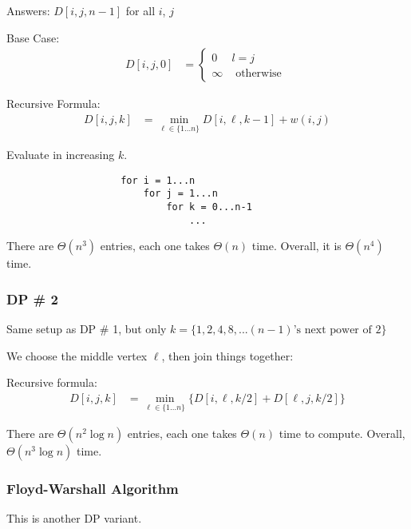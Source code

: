                 Answers: $D[i, j, n-1]$ for all $i$, $j$

                Base Case:
                \begin{align*}
                    D[i, j, 0] &=
                    \left\{
                        \begin{array}{lr}
                            0 & l = j \\
                            \infty & \text{ otherwise }
                        \end{array}
                    \right.
                \end{align*}

                Recursive Formula:
                \begin{align*}
                    D[i, j, k] &= \min_{\ell \in \{ 1 \ldots n \}} D[i, \ell, k-1] + w(i, j)
                \end{align*}

                Evaluate in increasing $k$.
                \begin{verbatim}
                    for i = 1...n
                        for j = 1...n
                            for k = 0...n-1
                                ...
                \end{verbatim}
                There are $\Theta(n^3)$ entries, each one takes $\Theta(n)$
                time. Overall, it is $\Theta(n^4)$ time.

            \subsubsection{DP \# 2}
                Same setup as DP \# 1, but only $k = \{1, 2, 4, 8, ... (n-1) \text{'s next power of 2} \}$

                We choose the middle vertex $\ell$, then join things together:

                Recursive formula:
                \begin{align*}
                    D[i, j, k] &= \min_{\ell \in \{ 1 \ldots n \}} \{ D[i, \ell, k/2] + D[\ell, j, k/2] \}
                \end{align*}

                There are $\Theta(n^2 \log n)$ entries, each one takes
                $\Theta(n)$ time to compute. Overall, $\Theta(n^3 \log n)$ time.
            \subsubsection{Floyd-Warshall Algorithm}
                This is another DP variant.

